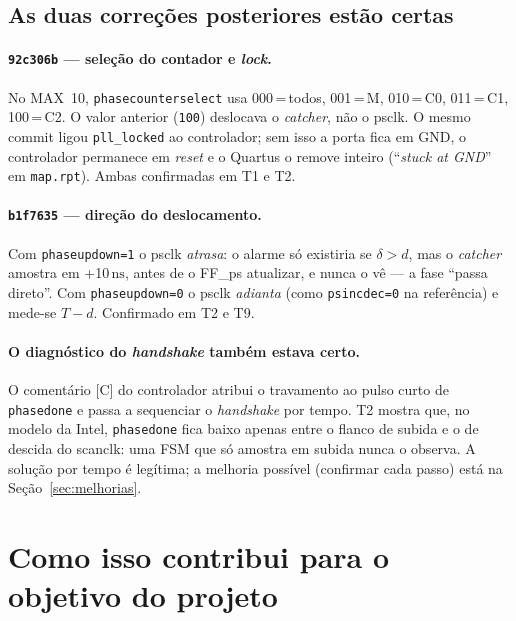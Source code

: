 \documentclass[11pt,a4paper]{article}
\newcommand{\ns}{\ensuremath{\,\mathrm{ns}}\xspace}
\newcommand{\file}[1]{\texttt{\small #1}}
\begin{document}
\subsection{As duas correções posteriores estão certas}

\paragraph{\texttt{92c306b} --- seleção do contador e \emph{lock}.} No MAX~10,
\texttt{phasecounterselect} usa 000\,=\,todos, 001\,=\,M, 010\,=\,C0, 011\,=\,C1, 100\,=\,C2.
O valor anterior (\texttt{100}) deslocava o \emph{catcher}, não o psclk. O mesmo commit ligou
\texttt{pll\_locked} ao controlador; sem isso a porta fica em GND, o controlador permanece em
\emph{reset} e o Quartus o remove inteiro (``\emph{stuck at GND}'' em \file{map.rpt}). Ambas
confirmadas em T1 e T2.

\paragraph{\texttt{b1f7635} --- direção do deslocamento.} Com \texttt{phaseupdown=1} o psclk
\emph{atrasa}: o alarme só existiria se $\delta > d$, mas o \emph{catcher} amostra em +10\ns,
antes de o FF\_ps atualizar, e nunca o vê --- a fase ``passa direto''. Com \texttt{phaseupdown=0}
o psclk \emph{adianta} (como \texttt{psincdec=0} na referência) e mede-se $T-d$. Confirmado em T2 e T9.

\paragraph{O diagnóstico do \emph{handshake} também estava certo.} O comentário [C] do
controlador atribui o travamento ao pulso curto de \texttt{phasedone} e passa a sequenciar o
\emph{handshake} por tempo. T2 mostra que, no modelo da Intel, \texttt{phasedone} fica baixo
apenas entre o flanco de subida e o de descida do scanclk: uma FSM que só amostra em subida
nunca o observa. A solução por tempo é legítima; a melhoria possível (confirmar cada passo)
está na Seção~\ref{sec:melhorias}.

\section{Como isso contribui para o objetivo do projeto}
\label{sec:contribuicao}
\end{document}
